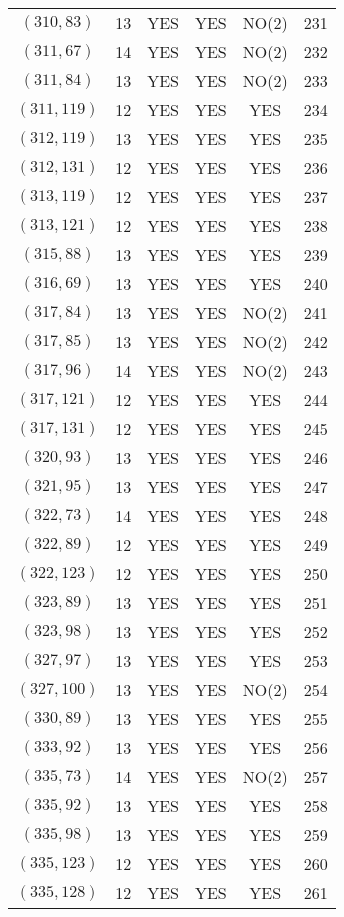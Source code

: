 \begin{longtable}{|c|c|c|c|c|c|}
$(310, 83)$ & 13 & YES & YES & NO(2) & 231\\
$(311, 67)$ & 14 & YES & YES & NO(2) & 232\\
$(311, 84)$ & 13 & YES & YES & NO(2) & 233\\
$(311, 119)$ & 12 & YES & YES & YES & 234\\
$(312, 119)$ & 13 & YES & YES & YES & 235\\
$(312, 131)$ & 12 & YES & YES & YES & 236\\
$(313, 119)$ & 12 & YES & YES & YES & 237\\
$(313, 121)$ & 12 & YES & YES & YES & 238\\
$(315, 88)$ & 13 & YES & YES & YES & 239\\
$(316, 69)$ & 13 & YES & YES & YES & 240\\
$(317, 84)$ & 13 & YES & YES & NO(2) & 241\\
$(317, 85)$ & 13 & YES & YES & NO(2) & 242\\
$(317, 96)$ & 14 & YES & YES & NO(2) & 243\\
$(317, 121)$ & 12 & YES & YES & YES & 244\\
$(317, 131)$ & 12 & YES & YES & YES & 245\\
$(320, 93)$ & 13 & YES & YES & YES & 246\\
$(321, 95)$ & 13 & YES & YES & YES & 247\\
$(322, 73)$ & 14 & YES & YES & YES & 248\\
$(322, 89)$ & 12 & YES & YES & YES & 249\\
$(322, 123)$ & 12 & YES & YES & YES & 250\\
$(323, 89)$ & 13 & YES & YES & YES & 251\\
$(323, 98)$ & 13 & YES & YES & YES & 252\\
$(327, 97)$ & 13 & YES & YES & YES & 253\\
$(327, 100)$ & 13 & YES & YES & NO(2) & 254\\
$(330, 89)$ & 13 & YES & YES & YES & 255\\
$(333, 92)$ & 13 & YES & YES & YES & 256\\
$(335, 73)$ & 14 & YES & YES & NO(2) & 257\\
$(335, 92)$ & 13 & YES & YES & YES & 258\\
$(335, 98)$ & 13 & YES & YES & YES & 259\\
$(335, 123)$ & 12 & YES & YES & YES & 260\\
$(335, 128)$ & 12 & YES & YES & YES & 261\\

\end{longtable}
